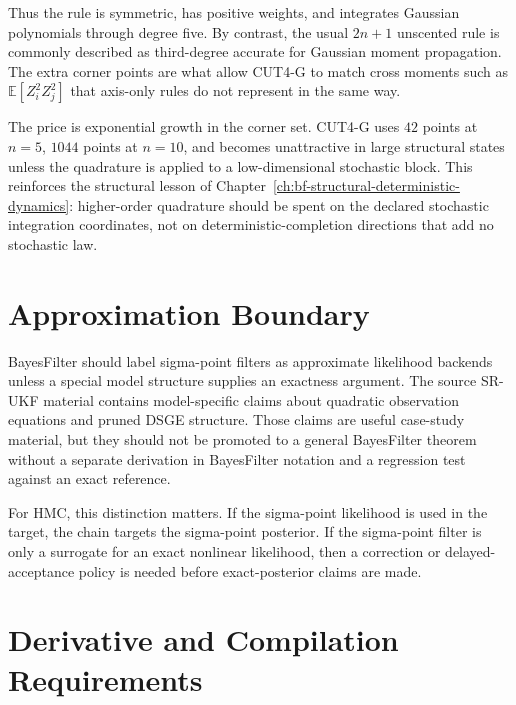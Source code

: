 Thus the rule is symmetric, has positive weights, and integrates Gaussian
polynomials through degree five.  By contrast, the usual $2n+1$ unscented rule
is commonly described as third-degree accurate for Gaussian moment propagation.
The extra corner points are what allow CUT4-G to match cross moments such as
$\mathbb{E}[Z_i^2Z_j^2]$ that axis-only rules do not represent in the same way.

The price is exponential growth in the corner set.  CUT4-G uses $42$ points at
$n=5$, $1044$ points at $n=10$, and becomes unattractive in large structural
states unless the quadrature is applied to a low-dimensional stochastic block.
This reinforces the structural lesson of
Chapter~\ref{ch:bf-structural-deterministic-dynamics}: higher-order quadrature
should be spent on the declared stochastic integration coordinates, not on
deterministic-completion directions that add no stochastic law.

\section{Approximation Boundary}
\label{sec:bf-sigma-point-approximation-boundary}

BayesFilter should label sigma-point filters as approximate likelihood
backends unless a special model structure supplies an exactness argument.
The source SR-UKF material contains model-specific claims about quadratic
observation equations and pruned DSGE structure.  Those claims are useful
case-study material, but they should not be promoted to a general BayesFilter
theorem without a separate derivation in BayesFilter notation and a regression
test against an exact reference.

For HMC, this distinction matters.  If the sigma-point likelihood is used in
the target, the chain targets the sigma-point posterior.  If the sigma-point
filter is only a surrogate for an exact nonlinear likelihood, then a correction
or delayed-acceptance policy is needed before exact-posterior claims are made.

\section{Derivative and Compilation Requirements}
\label{sec:bf-sigma-point-derivative-requirements}


